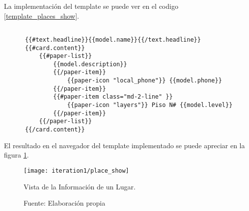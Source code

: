 La implementación del template se puede ver en el codigo \ref{template_places_show}. \\

\begin{center}
  \begin{lstlisting}[label=template_places_show,caption=Template para mostrar la información de un lugar]

      {{#text.headline}}{{model.name}}{{/text.headline}}
      {{#card.content}}
          {{#paper-list}}
              {{model.description}}
              {{/paper-item}}
                  {{paper-icon "local_phone"}} {{model.phone}}
              {{/paper-item}}
              {{#paper-item class="md-2-line" }}
                  {{paper-icon "layers"}} Piso N# {{model.level}}
              {{/paper-item}}
          {{/paper-list}}
      {{/card.content}}

  \end{lstlisting}
\end{center}

El resultado en el navegador del template implementado se puede apreciar en la figura \ref{fig:place_show}. \\

\begin{figure}[H]
  \begin{center}
    \texttt{[image: iteration1/place\_show]}
    \caption{Vista de la Información de un Lugar.}
    \label{fig:place_show}
    \caption*{Fuente: Elaboración propia}
  \end{center}
\end{figure}




